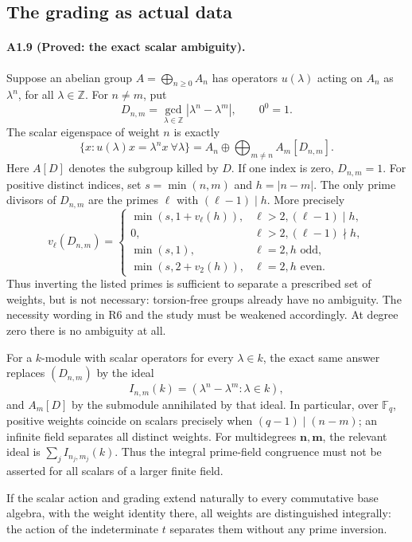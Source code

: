 \subsection{The grading as actual data}

\paragraph{A1.9 (Proved: the exact scalar ambiguity).}
Suppose an abelian group $A=\bigoplus_{n\geq0}A_n$ has operators
$u(\lambda)$ acting on $A_n$ as $\lambda^n$, for all $\lambda\in\mathbb Z$.
For $n\ne m$, put
\[
 D_{n,m}=\gcd_{\lambda\in\mathbb Z}|\lambda^n-\lambda^m|,
 \qquad 0^0=1.
\]
The scalar eigenspace of weight $n$ is exactly
\[
 \{x:u(\lambda)x=\lambda^n x\ \forall\lambda\}
  =A_n\oplus\bigoplus_{m\ne n}A_m[D_{n,m}].
 \tag{A1.15}
\]
Here $A[D]$ denotes the subgroup killed by $D$. If one index is zero,
$D_{n,m}=1$. For positive distinct indices, set $s=\min(n,m)$ and
$h=|n-m|$. The only prime divisors of $D_{n,m}$ are the primes
$\ell$ with $(\ell-1)\mid h$. More precisely
\[
 v_\ell(D_{n,m})=
 \begin{cases}
 \min(s,1+v_\ell(h)),&\ell>2, (\ell-1)\mid h,\\
 0,&\ell>2, (\ell-1)\nmid h,\\
 \min(s,1),&\ell=2, h\text{ odd},\\
 \min(s,2+v_2(h)),&\ell=2, h\text{ even}.
 \end{cases}
 \tag{A1.16}
\]
Thus inverting the listed primes is sufficient to separate a prescribed
set of weights, but is not necessary: torsion-free groups already have
no ambiguity. The necessity wording in R6 and the study must be
weakened accordingly. At degree zero there is no ambiguity at all.

For a $k$-module with scalar operators for every $\lambda\in k$, the
exact same answer replaces $(D_{n,m})$ by the ideal
\[
 I_{n,m}(k)=(\lambda^n-\lambda^m:\lambda\in k),
\]
and $A_m[D]$ by the submodule annihilated by that ideal. In particular,
over $\mathbb F_q$, positive weights coincide on scalars precisely
when $(q-1)\mid(n-m)$; an infinite field separates all distinct
weights. For multidegrees $\mathbf n,\mathbf m$, the relevant ideal
is $\sum_j I_{n_j,m_j}(k)$. Thus the integral prime-field congruence
must not be asserted for all scalars of a larger finite field.

If the scalar action and grading extend naturally to every
commutative base algebra, with the weight identity there, all weights
are distinguished integrally: the action of the indeterminate $t$
separates them without any prime inversion.


